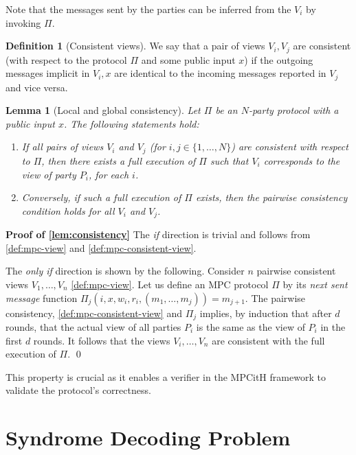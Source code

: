 \documentclass[11pt]{report}
\theoremstyle{definition}
\newtheorem{definition}{Definition}[section]
\theoremstyle{plain}
\newtheorem{lemma}{Lemma}[section]
\begin{document}
\noindent Note that the messages sent by the parties can be inferred from the $V_i$ by invoking $\Pi$.

\begin{definition}[Consistent views]\label{def:mpc-consistent-view}
  We say that a pair of views $V_i, V_j$ are consistent (with respect to the protocol $\Pi$ and some public input $x$) if the outgoing messages implicit in $V_i, x$ are identical to the incoming messages reported in $V_j$ and vice versa.
\end{definition}

\begin{lemma}[Local and global consistency]\label{lem:consistency}
  Let $\Pi$ be an $N$-party protocol with a public input $x$. The following statements hold:
  \begin{enumerate}
    \item If all pairs of views $V_i$ and $V_j$ (for $i, j \in \{1, \dots, N\}$) are consistent with respect to $\Pi$, then there exists a full execution of $\Pi$ such that $V_i$ corresponds to the view of party $P_i$, for each $i$.
    \item Conversely, if such a full execution of $\Pi$ exists, then the pairwise consistency condition holds for all $V_i$ and $V_j$.
  \end{enumerate}
\end{lemma}

\textbf{Proof of \autoref{lem:consistency}} The \textit{if} direction is trivial and follows from \autoref{def:mpc-view} and \autoref{def:mpc-consistent-view}.

The \textit{only if} direction is shown by the following. Consider $n$ pairwise consistent views $V_1, \dots, V_n$ \autoref{def:mpc-view}. Let us define an MPC protocol $\Pi$ by its \textit{next sent message} function $\Pi_j(i,x,w_i,r_i, (m_1, \dots, m_j)) = m_{j+1}$. The pairwise consistency, \autoref{def:mpc-consistent-view} and $\Pi_j$ implies, by induction that after $d$ rounds, that the actual view of all parties $P_i$ is the same as the view of $P_i$ in the first $d$ rounds. It follows that the views $V_i, \dots, V_n$ are consistent with the full execution of $\Pi$. \qed

This property is crucial as it enables a verifier in the MPCitH framework to validate the protocol's correctness.

\section{Syndrome Decoding Problem}\label{sec:syndrome}
\end{document}
